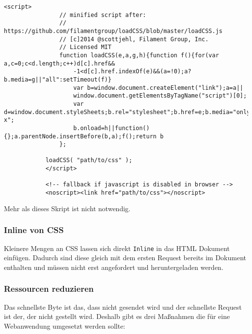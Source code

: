 			\begin{lstlisting}[captionpos=b, caption=load a CSS file asynchronously, label=lst:deferCSS, breaklines=false]
			<script>
				// minified script after: 
				// https://github.com/filamentgroup/loadCSS/blob/master/loadCSS.js
				// [c]2014 @scottjehl, Filament Group, Inc.
				// Licensed MIT
	 			function loadCSS(e,a,g,h){function f(){for(var a,c=0;c<d.length;c++)d[c].href&&
	 				-1<d[c].href.indexOf(e)&&(a=!0);a?b.media=g||"all":setTimeout(f)}
	 				var b=window.document.createElement("link");a=a||
	 				window.document.getElementsByTagName("script")[0];
	 				var d=window.document.styleSheets;b.rel="stylesheet";b.href=e;b.media="only x";
	 				b.onload=h||function(){};a.parentNode.insertBefore(b,a);f();return b
	 			};

	  		loadCSS( "path/to/css" );
			</script>

			<!-- fallback if javascript is disabled in browser -->
			<noscript><link href="path/to/css"></noscript>
			\end{lstlisting}

			Mehr als dieses Skript ist nicht notwendig.
				

		\subsubsection{Inline von CSS} %
		\label{ssub:inline_von_css}
			Kleinere Mengen an CSS lassen sich direkt \texttt{Inline} in das HTML Dokument einfügen. Dadurch sind diese gleich mit dem ersten Request bereits im Dokument enthalten und müssen nicht erst angefordert und heruntergeladen werden.

		\subsubsection{Ressourcen reduzieren} %
		\label{ssub:ressourcen_reduzieren}
			Das schnellste Byte ist das, dass nicht gesendet wird und der schnellste Request ist der, der nicht gestellt wird. Deshalb gibt es drei Maßnahmen die für eine Webanwendung umgesetzt werden sollte:

